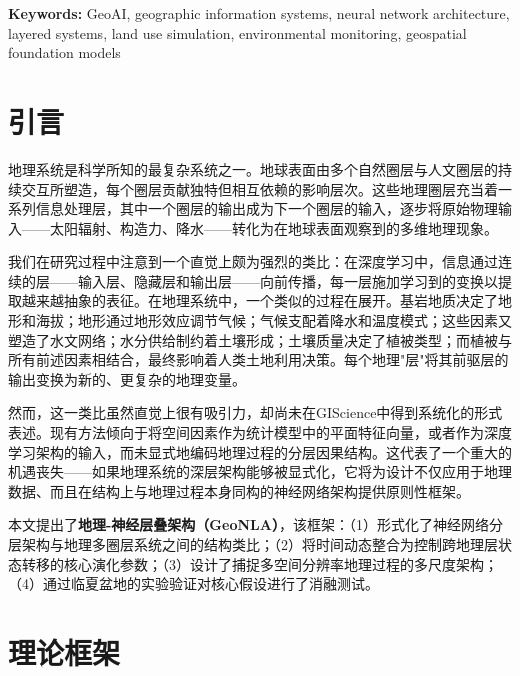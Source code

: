 \documentclass[11pt,a4paper]{article}
\begin{document}
\noindent\textbf{Keywords:} GeoAI, geographic information systems, neural network architecture, layered systems, land use simulation, environmental monitoring, geospatial foundation models

\bigskip

\newpage

\section{引言}
\label{sec:introduction}

地理系统是科学所知的最复杂系统之一。地球表面由多个自然圈层与人文圈层的持续交互所塑造，每个圈层贡献独特但相互依赖的影响层次。这些地理圈层充当着一系列信息处理层，其中一个圈层的输出成为下一个圈层的输入，逐步将原始物理输入——太阳辐射、构造力、降水——转化为在地球表面观察到的多维地理现象。

我们在研究过程中注意到一个直觉上颇为强烈的类比：在深度学习中，信息通过连续的层——输入层、隐藏层和输出层——向前传播，每一层施加学习到的变换以提取越来越抽象的表征。在地理系统中，一个类似的过程在展开。基岩地质决定了地形和海拔；地形通过地形效应调节气候；气候支配着降水和温度模式；这些因素又塑造了水文网络；水分供给制约着土壤形成；土壤质量决定了植被类型；而植被与所有前述因素相结合，最终影响着人类土地利用决策。每个地理"层"将其前驱层的输出变换为新的、更复杂的地理变量。

然而，这一类比虽然直觉上很有吸引力，却尚未在GIScience中得到系统化的形式表述。现有方法倾向于将空间因素作为统计模型中的平面特征向量，或者作为深度学习架构的输入，而未显式地编码地理过程的分层因果结构。这代表了一个重大的机遇丧失——如果地理系统的深层架构能够被显式化，它将为设计不仅应用于地理数据、而且在结构上与地理过程本身同构的神经网络架构提供原则性框架。

本文提出了\textbf{地理-神经层叠架构（GeoNLA）}，该框架：（1）形式化了神经网络分层架构与地理多圈层系统之间的结构类比；（2）将时间动态整合为控制跨地理层状态转移的核心演化参数；（3）设计了捕捉多空间分辨率地理过程的多尺度架构；（4）通过临夏盆地的实验验证对核心假设进行了消融测试。

\section{理论框架}
\label{sec:theory}
\end{document}
